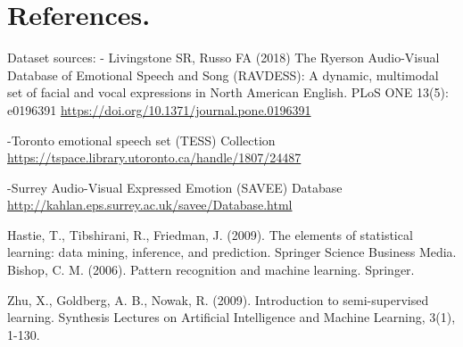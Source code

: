 \newpage
\section*{References.}
\renewcommand\refname{}
%


\begin{thebibliography}{00}






Dataset sources: 
- Livingstone SR, Russo FA (2018) The Ryerson Audio-Visual Database of Emotional Speech and Song (RAVDESS): A dynamic, multimodal set of facial and vocal expressions in North American English. PLoS ONE 13(5): e0196391 
\url{https://doi.org/10.1371/journal.pone.0196391}

-Toronto emotional speech set (TESS) Collection
\url{https://tspace.library.utoronto.ca/handle/1807/24487}

-Surrey Audio-Visual Expressed Emotion (SAVEE) Database
\url{http://kahlan.eps.surrey.ac.uk/savee/Database.html}

Hastie, T., Tibshirani, R., Friedman, J. (2009). The elements of statistical learning: data mining, inference, and prediction. Springer Science Business Media.\\

Bishop, C. M. (2006). Pattern recognition and machine learning. Springer.

Zhu, X., Goldberg, A. B., Nowak, R. (2009). Introduction to semi-supervised learning. Synthesis Lectures on Artificial Intelligence and Machine Learning, 3(1), 1-130.\\


\end{thebibliography}
